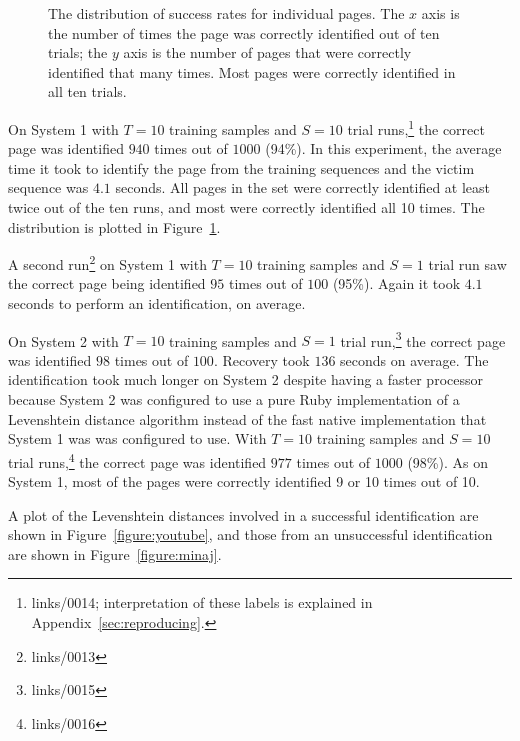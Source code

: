 \documentclass[letterpaper,twocolumn,10pt]{article}
\begin{document}

\begin{figure}[h]
    \centering
    
    \vspace*{-2em}
    \caption{The distribution of success rates for individual pages. The $x$
        axis is the number of times the page was correctly identified out of ten
        trials; the $y$ axis is the number of pages that were correctly
        identified that many times. Most pages were correctly identified in all
        ten trials.}
    \vspace*{-1em}
    \label{figure:distribution}
\end{figure}

On System 1 with $T=10$ training samples and $S=10$ trial
runs,\footnote{links/0014; interpretation of these labels is explained in
Appendix~\ref{sec:reproducing}.} the correct page was identified $940$ times out
of $1000$ (94\%). In this experiment, the average time it took to identify the
page from the training sequences and the victim sequence was $4.1$ seconds. All
pages in the set were correctly identified at least twice out of the ten runs,
and most were correctly identified all 10 times. The distribution is plotted in
Figure~\ref{figure:distribution}.

A second run\footnote{links/0013} on System 1 with $T=10$ training samples and
$S=1$ trial run saw the correct page being identified $95$ times out of $100$
(95\%). Again it took $4.1$ seconds to perform an identification, on average.

On System 2 with $T=10$ training samples and $S=1$ trial
run,\footnote{links/0015} the correct page was identified $98$ times out of
$100$. Recovery took $136$ seconds on average. The identification took much
longer on System 2 despite having a faster processor because System 2 was
configured to use a pure Ruby implementation of a Levenshtein distance algorithm
instead of the fast native implementation that System 1 was was configured to
use. With $T=10$ training samples and $S=10$ trial runs,\footnote{links/0016}
the correct page was identified $977$ times out of $1000$ (98\%). As on System
1, most of the pages were correctly identified 9 or 10 times out of 10.

A plot of the Levenshtein distances involved in a successful identification are
shown in Figure~\ref{figure:youtube}, and those from an unsuccessful
identification are shown in Figure~\ref{figure:minaj}.
\end{document}
